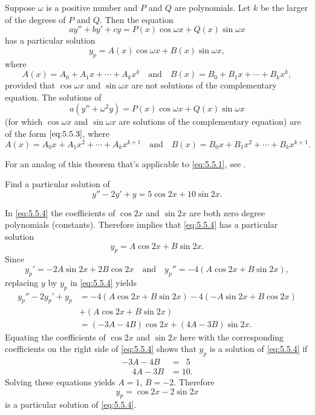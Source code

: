 \begin{theorem}\label{thmtype:5.5.1}
Suppose $\omega$ is a positive number and $P$ and $Q$ are
polynomials. Let $k$ be the larger of the degrees of $P$ and $Q$. Then
the equation
\[
ay''+by'+cy=P(x)\cos \omega x+Q(x)\sin \omega x
\]
has a particular solution
\begin{equation} \label{eq:5.5.3}
y_p=A(x)\cos\omega x+B(x)\sin\omega x,
\end{equation}
where
\[
A(x)=A_0+A_1x+\cdots+A_kx^k \quad\text{and}\quad 
B(x)=B_0+B_1x+\cdots+B_kx^k,
\]
provided that $\cos\omega x$ and $\sin\omega x$ are
not solutions of  the complementary equation. The solutions of
\[
a(y''+\omega^2y)=P(x)\cos \omega x+Q(x)\sin \omega x
\]
(for which $\cos\omega x$ and $\sin\omega x$ are solutions of the
complementary equation) are of the form $\eqref{eq:5.5.3}$,
where
\[
A(x)=A_0x+A_1x^2+\cdots+A_kx^{k+1} \quad\text{and}\quad 
B(x)=B_0x+B_1x^2+\cdots+B_kx^{k+1}.
\]
\end{theorem}


For an analog of this theorem that's applicable to \eqref{eq:5.5.1},
see .


\begin{example}\label{example:5.5.1}
Find a particular solution of
\begin{equation} \label{eq:5.5.4}
y''-2y'+y=5\cos2x+10\sin2x.
\end{equation}
\end{example}

\begin{solution}
In \eqref{eq:5.5.4} the coefficients of $\cos2x$ and $\sin2x$ are both zero
degree polynomials (constants). Therefore 
implies that \eqref{eq:5.5.4} has a particular solution
\[
y_p=A\cos2x+B\sin2x.
\]
Since
\[
y_p'=-2A\sin2x+2B\cos2x\quad\text{and}\quad 
y_p''=-4(A\cos2x+B\sin2x),
\]
replacing $y$ by $y_p$ in  \eqref{eq:5.5.4} yields
\begin{align*}
y_p''-2y_p'+y_p&=-4(A\cos2x+B\sin2x)-4(-A\sin2x+B\cos2x)\\
&+(A\cos2x+B\sin2x)\\
&=(-3A-4B)\cos2x+(4A-3B)\sin2x.
\end{align*}
Equating the coefficients of $\cos2x$ and $\sin2x$ here with the
corresponding coefficients on the right side of \eqref{eq:5.5.4}
shows that $y_p$ is a solution of \eqref{eq:5.5.4}  if
\begin{align*}
-3A-4B&=\phantom{1}5\phantom{.}\\
\phantom{-}4A-3B&=10.
\end{align*}
Solving these equations yields $A=1$, $B=-2$.  Therefore
\[
y_p=\cos2x-2\sin2x
\]
is a particular solution of \eqref{eq:5.5.4}.
\end{solution}

